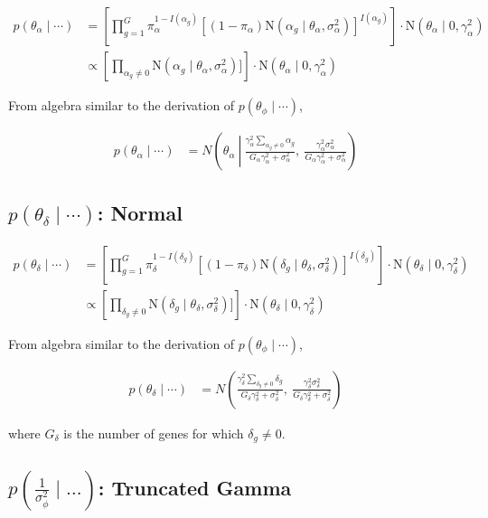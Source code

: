 \documentclass{article}\usepackage{graphicx, color}
\begin{document}
\begin{flushleft}
\begin{align*}
p(\theta_\alpha \mid \cdots ) &= \left [ \prod_{g = 1}^G  \pi_\alpha^{1-I(\alpha_g)} [(1- \pi_\alpha) \text{N}(\alpha_g \mid \theta_\alpha, \sigma_\alpha^2)]^{I(\alpha_g)}  \right ]  \cdot \text{N}(\theta_\alpha \mid 0, \gamma_\alpha^2) \\
& \propto \left [ \prod_{\alpha_g \ne 0} \text{N}(\alpha_g \mid \theta_\alpha, \sigma_\alpha^2)]  \right ]  \cdot \text{N}(\theta_\alpha \mid 0, \gamma_\alpha^2)
\end{align*}

From algebra similar to the derivation of $p(\theta_\phi \mid \cdots)$,

\begin{align*}
p(\theta_\alpha \mid \cdots) &= N \left ( \theta_\alpha \ \left | \ \frac{\gamma_\alpha^2 \sum_{\alpha_g \ne 0} \alpha_g}{G_\alpha \gamma_\alpha^2 + \sigma_\alpha^2}, \right . \ \frac{\gamma_\alpha^2 \sigma_\alpha^2}{G_\alpha \gamma_\alpha^2 + \sigma_\alpha^2} \right ) 
\end{align*}

\subsection{$p(\theta_\delta \mid \cdots )$: Normal}

\begin{align*}
p(\theta_\delta \mid \cdots ) &= \left [ \prod_{g = 1}^G  \pi_\delta^{1-I(\delta_g)} [(1- \pi_\delta) \text{N}(\delta_g \mid \theta_\delta, \sigma_\delta^2)]^{I(\delta_g)}  \right ]  \cdot \text{N}(\theta_\delta \mid 0, \gamma_\delta^2) \\
& \propto \left [ \prod_{\delta_g \ne 0} \text{N}(\delta_g \mid \theta_\delta, \sigma_\delta^2)]  \right ]  \cdot \text{N}(\theta_\delta \mid 0, \gamma_\delta^2)
\end{align*}

From algebra similar to the derivation of $p(\theta_\phi \mid \cdots)$, 

\begin{align*}
p(\theta_\delta \mid \cdots) &= N \left ( \frac{\gamma_\delta^2 \sum_{\delta_g \ne 0} \delta_g}{G_\delta \gamma_\delta^2 + \sigma_\delta^2}, \ \frac{\gamma_\delta^2 \sigma_\delta^2}{G_\delta \gamma_\delta^2 + \sigma_\delta^2} \right ) 
\end{align*}

where $G_\delta$ is the number of genes for which $\delta_g \ne 0$.

\subsection{$p\left ( \frac{1}{\sigma_\phi^2} \mid \ldots \right )$: Truncated Gamma}


\end{flushleft}
\end{document}
